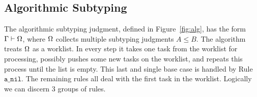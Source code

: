 \subsection{Algorithmic Subtyping}

The algorithmic subtyping judgment, defined in Figure~\ref{fig:alg}, has the form $\Gamma\vdash\Omega$, where
$\Omega$ collects multiple subtyping judgments $A\le B$. 
The algorithm treats $\Omega$ as a worklist. In every step
it takes one task from the worklist for processing, possibly
pushes some new tasks on the worklist, and repeats this
process until the list is empty. This last and single base case
is handled by Rule~$\mathtt{a\_nil}$.
The remaining rules all deal with the first task in the worklist.
Logically we can discern 3 groups of rules.

